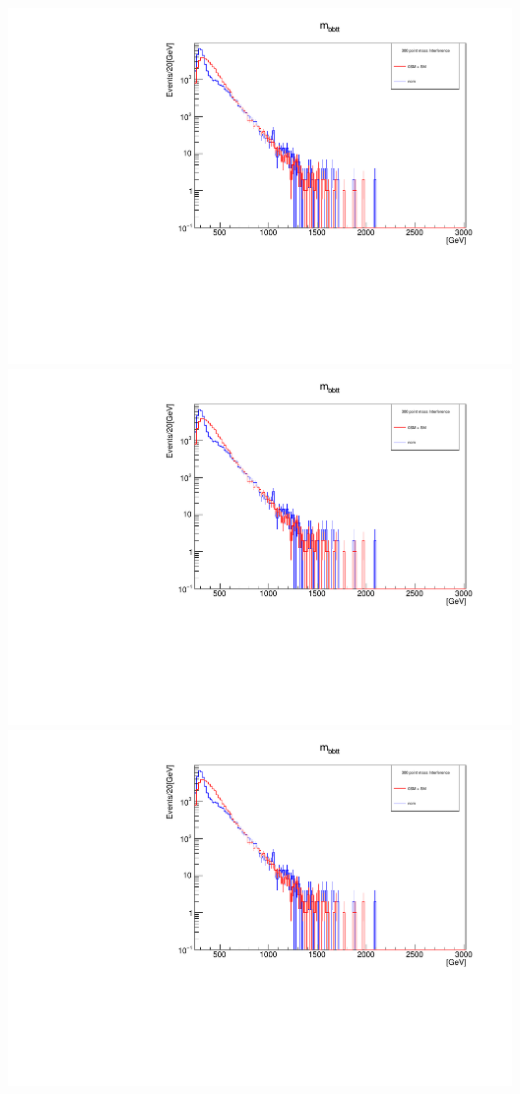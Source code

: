 \documentclass[a4wide,10pt]{article}
\begin{document}
\includegraphics[scale=0.50,page=4]{InterferencePlots30p.pdf}
\includegraphics[scale=0.50,page=5]{InterferencePlots30p.pdf}
\includegraphics[scale=0.50,page=6]{InterferencePlots30p.pdf}
\end{document}

